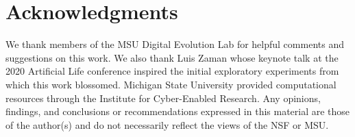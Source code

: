 
\section*{Acknowledgments}


We thank members of the MSU Digital Evolution Lab for helpful comments and suggestions on this work. 
We also thank Luis Zaman whose keynote talk at the 2020 Artificial Life conference inspired the initial exploratory experiments from which this work blossomed. 
Michigan State University provided computational resources through the Institute for Cyber-Enabled Research. 
Any opinions, findings, and conclusions or recommendations expressed in this material are those of the author(s) and do not necessarily reflect the views of the NSF or MSU.